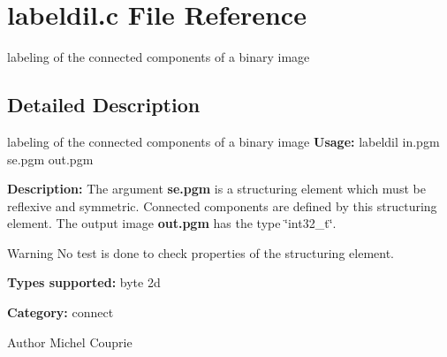 \section{labeldil.c File Reference}
\label{labeldil_8c}


labeling of the connected components of a binary image  




\subsection{Detailed Description}
labeling of the connected components of a binary image {\bfseries Usage:} labeldil in.pgm se.pgm out.pgm

{\bfseries Description:} The argument {\bfseries se.pgm} is a structuring element which must be reflexive and symmetric. Connected components are defined by this structuring element. The output image {\bfseries out.pgm} has the type \char`\"{}int32\_\-t\char`\"{}.

\begin{DoxyWarning}{Warning}
No test is done to check properties of the structuring element.
\end{DoxyWarning}
{\bfseries Types supported:} byte 2d

{\bfseries Category:} connect

\begin{DoxyAuthor}{Author}
Michel Couprie 
\end{DoxyAuthor}
